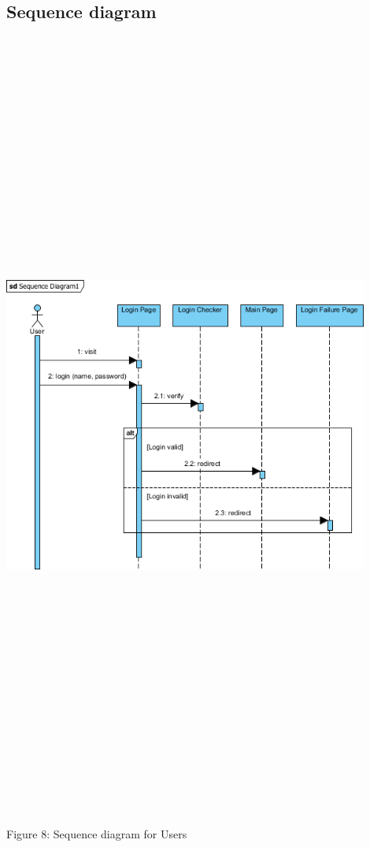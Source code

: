 \subsection{Sequence diagram}
    \includegraphics[width=12cm,height=26cm,keepaspectratio]{users_unit/Images/users sequence diagram.png}
	\begin{center}
	    \small{Figure 8: Sequence diagram for Users }
    \end{center}

